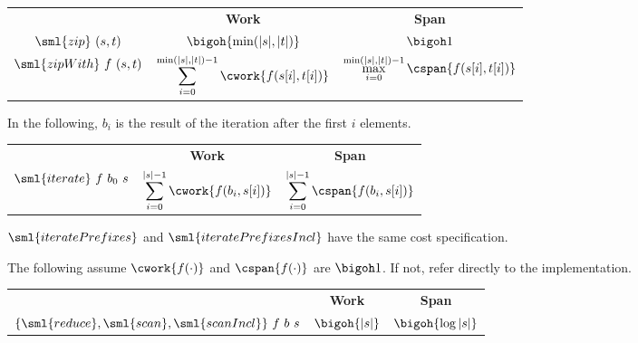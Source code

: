 \begin{cluster}
\label{grp:cst:array-seq::zip}

\begin{costspec}[Zip]
\label{cst:array-seq::zip}
\begin{tabular}{c|c|c}
& \textbf{Work} & \textbf{Span} \\
$\sml{zip}~(s,t)$ &
$\displaystyle \bigoh{\min(|s|,|t|)}$ &
$\displaystyle \bigoh 1$ \\
$\sml{zipWith}~f~(s,t)$ &
$\displaystyle \sum_{i = 0}^{\min(|s|,|t|)-1} \cwork{f(s[i],t[i])}$ &
$\displaystyle \max_{i = 0}^{\min(|s|,|t|)-1} \cspan{f(s[i],t[i])}$
\end{tabular}

\end{costspec}
\end{cluster}

\begin{flex}
\label{grp:grm:array-seq::iteration}

\begin{gram}
\label{grm:array-seq::iteration}
\begin{costspec}[Iteration]
In the following, $b_i$ is the result of the iteration after the first $i$
elements.
\begin{tabular}{c|c|c}
& \textbf{Work} & \textbf{Span} \\
$\sml{iterate}~f~b_0~s$ &
$\displaystyle \sum_{i = 0}^{|s|-1} \cwork{f(b_i, s[i])}$ &
$\displaystyle \sum_{i = 0}^{|s|-1} \cspan{f(b_i, s[i])}$
\end{tabular}
\end{costspec}
\begin{note}
$\sml{iteratePrefixes}$ and $\sml{iteratePrefixesIncl}$ have the same cost
specification.
\end{note}

\end{gram}
\end{flex}

\begin{cluster}
\label{grp:cst:array-seq::parallel-aggregation}

\begin{costspec}
\label{cst:array-seq::parallel-aggregation}
The following assume $\cwork{f(\cdot)}$ and $\cspan{f(\cdot)}$ are $\bigoh 1$. If not,
refer directly to the implementation.
\begin{tabular}{c|c|c}
& \textbf{Work} & \textbf{Span} \\
$\{\sml{reduce},\sml{scan},\sml{scanIncl}\}~f~b~s$ &
$\displaystyle \bigoh{|s|}$ &
$\displaystyle \bigoh{\log{|s|}}$
\end{tabular}

\end{costspec}
\end{cluster}

